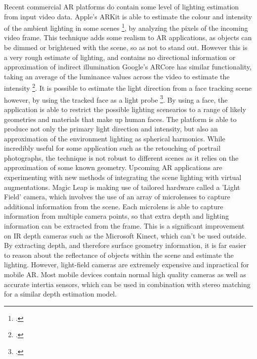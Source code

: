 \documentclass[ %
                    author={Gavin Parker},
                supervisor={Dr. Neill Campbell},
                    degree={MEng},
                     title={Deep Siamese Networks for Illumination Estimation from Stereo Images},
                  subtitle={},
                      type={research},
                      year={2018} ]{dissertation}
\begin{document}
Recent commercial AR platforms do contain some level of lighting estimation from input video data. Apple's ARKit is able to estimate the colour and intensity of the ambient lighting in some scenes \footcite{https://developer.apple.com/documentation/arkit/arlightestimate}, by analyzing the pixels of the incoming video frame. This technique adds some realism to AR applications, as objects can be dimmed or brightened with the scene, so as not to stand out. However this is a very rough estimate of lighting, and contains no directional information or approximation of indirect illumination  Google's ARCore has similar functionality, taking an average of the luminance values across the video to estimate the intensity \footcite{https://developers.google.com/ar/reference/unity/prefab/Environmental_Light}. It is possible to estimate the light direction from a face tracking scene however, by using the tracked face as a light probe \footcite{https://developer.apple.com/documentation/arkit/ardirectionallightestimate}. By using a face, the application is able to restrict the possible lighting scenearios to a range of likely geometries and materials that make up human faces. The platform is able to produce not only the primary light direction and intensity, but also an approximation of the environment lighting as spherical harmonics. While incredibly useful for some application such as the retouching of portrail photographs, the technique is not robust to different scenes as it relies on the approximation of some known geometry.
\newline
Upcoming AR applications are experimenting with new methods of integrating the scene lighting with virtual augmentations. Magic Leap is making use of tailored hardware called a 'Light Field' camera, which involves the use of an array of microlenses to capture additional information from the scene. Each microlens is able to capture information from multiple camera points, so that extra depth and lighting information can be extracted from the frame. This is a significant improvement on IR depth cameras such as the Microsoft Kinect, which can't be used outside. By extracting depth, and therefore surface geometry information, it is far easier to reason about the reflectance of objects within the scene and estimate the lighting. However, light-field cameras are extremely expensive and inpractical for mobile AR. Most mobile devices contain normal high quality cameras as well as accurate intertia sensors, which can be used in combination with stereo matching for a similar depth estimation model.
\end{document}
